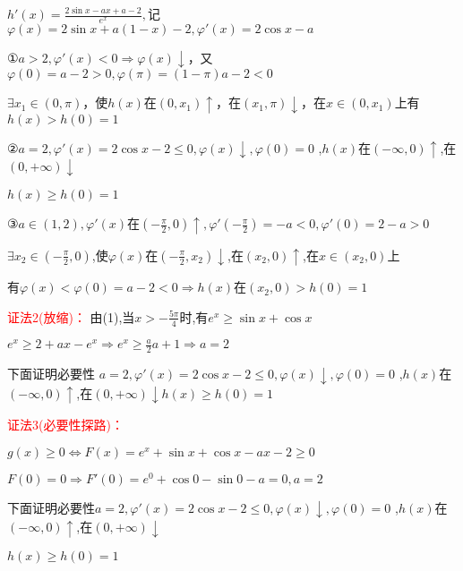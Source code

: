 \documentclass[a4paper,12pt]{article}
\begin{document}
\begin{flushleft}
$h'(x) = \frac{{2\sin x - ax + a - 2}}{{{e^x}}},$记$\varphi (x) = 2\sin x + a(1 - x) - 2,\varphi '(x) = 2\cos x - a$

①$a > 2,\varphi '(x) < 0 \Rightarrow \varphi (x) \downarrow $，又$\varphi (0) = a - 2 > 0,\varphi (\pi ) = (1 - \pi )a - 2 < 0$

$\exists {x_1} \in (0,\pi )$，使$h(x)$在$(0,x_1)\uparrow$，在$(x_1,\pi)\downarrow$，在$x\in(0,x_1)$上有$h(x)>h(0)=1$

②$a = 2,\varphi '(x) = 2\cos x - 2 \le 0,\varphi (x) \downarrow ,\varphi (0) = 0$ ,$h(x)$在$(-\infty,0)\uparrow$,在$(0,+\infty)\downarrow$

$h(x)\ge h(0)=1$

③$a \in (1,2),\varphi '(x)$在$\left( { - \frac{\pi }{2},0} \right) \uparrow ,\varphi '\left( { - \frac{\pi }{2}} \right) =  - a < 0,\varphi '\left( 0 \right) = 2 - a > 0$

$\exists {x_2} \in \left( { - \frac{\pi }{2},0} \right)$,使$\varphi(x)$在$\left( { - \frac{\pi }{2},x_2} \right)\downarrow$,在$(x_2,0)\uparrow$,在$x\in(x_2,0)$上

有$\varphi(x)<\varphi(0)=a-2<0\Rightarrow h(x)$在$(x_2,0)>h(0)=1$

\textcolor{red}{证法2(放缩)：}
由(1),当$x>-\frac{5 \pi}{4} $时,有$e^x \ge \sin x + \cos x $

${e^x} \ge 2 + ax - {e^x} \Rightarrow {e^x} \ge \frac{a}{2}a + 1 \Rightarrow a = 2$

下面证明必要性
$a = 2,\varphi '(x) = 2\cos x - 2 \le 0,\varphi (x) \downarrow ,\varphi (0) = 0$ ,$h(x)$在$(-\infty,0)\uparrow$,在$(0,+\infty)\downarrow h(x)\ge h(0)=1$

\textcolor{red}{证法3(必要性探路)：}

$g(x) \ge 0 \Leftrightarrow F(x) = {e^x} + \sin x + \cos x - ax - 2 \ge 0 $ 

$  F(0) = 0 \Rightarrow F'(0) = {e^0} + \cos 0 - \sin 0 - a = 0,a = 2$

下面证明必要性$a = 2,\varphi '(x) = 2\cos x - 2 \le 0,\varphi (x) \downarrow ,\varphi (0) = 0$ ,$h(x)$在$(-\infty,0)\uparrow$,在$(0,+\infty)\downarrow$

$h(x)\ge h(0)=1$
\end{flushleft}
\end{document}
